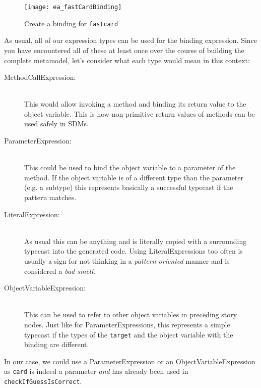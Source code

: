 \begin{itemize}
\begin{figure}[htbp]
\begin{center}
  \texttt{[image: ea\_fastCardBinding]}
  \caption{Create a binding for \texttt{fastcard}}  
  \label{fig:fastCardBinding}
\end{center}
\end{figure}

 \clearpage

As usual, all of our expression types can be used for the binding expression. Since you have encountered all of these at least once over the course of building
the complete metamodel, let's consider what each type would mean in this context:
\begin{description}
  \item[MethodCallExpression:]~\\ This would allow invoking a method and binding
  its return value to the object variable.  This is how non-primitive return
  values of methods can be used safely in SDMs.
  
  \item[ParameterExpression:]~\\ This could be used to bind the object variable
  to a parameter of the method.  If the object variable is of a different type
  than the parameter (e.g. a subtype) this represents basically a successful
  typecast if the pattern matches.
  
  \item[LiteralExpression:]~\\ As usual this can be anything and is literally
  copied with a surrounding typecast into the generated code.  Using
  LiteralExpressions too often is usually a sign for not thinking in a
  \emph{pattern oriented} manner and is considered a \emph{bad smell}.

  
  \item[ObjectVariableExpression:]~\\ This can be used to refer to other object
  variables in preceding story nodes.  Just like for ParameterExpressions, this
  represents a simple typecast if the types of the \texttt{target} and the
  object variable with the binding are different.
\end{description}

In our case, we could use a ParameterExpression or an ObjectVariableExpression as \texttt{card} is indeed a parameter \emph{and} has already been used in
\texttt{checkIfGuessIsCorrect}. 

\vspace{0.5cm}


\end{itemize}
